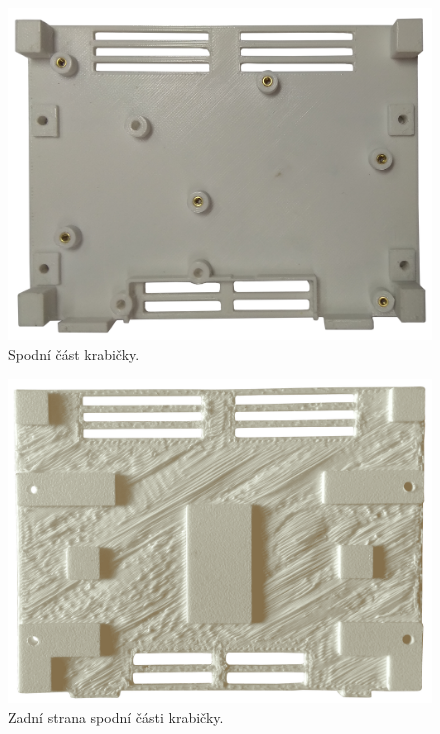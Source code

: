 \begin{figure}[H]
    \centering
    \includegraphics[width=\textwidth]{images/krabicka-nastenny-snimac-prostorove-teploty/krabicka-nastenny-snimac-prostorove-teploty-spodni-cast.png}
    \caption{Spodní část krabičky.}
    \label{fig:krabicka-nastenny-snimac-prostorove-teploty-spodni-cast}
\end{figure}

\begin{figure}[H]
    \centering
    \includegraphics[width=\textwidth]{images/krabicka-nastenny-snimac-prostorove-teploty/krabicka-nastenny-snimac-prostorove-teploty-spodni-cast-zezadu.png}
    \caption{Zadní strana spodní části krabičky.}
    \label{fig:krabicka-nastenny-snimac-prostorove-teploty-spodni-cast-zezadu}
\end{figure}

